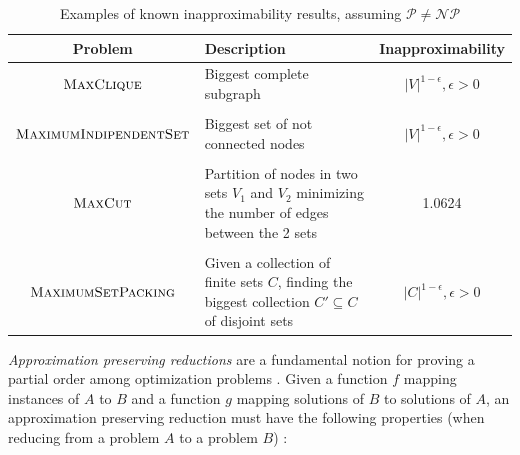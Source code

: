 \begin{table}
	\centering
	\caption[Examples of inapproximability]{Examples of known inapproximability results, assuming $\mathcal{P}
			\neq \mathcal{NP} $ \cite{10.1007/3-540-63248-4_10} }
	\label{tab:inapproximability-examples}
	\begin{tabular}{c|p{5cm}|c}
		Problem                                                          & Description               & Inapproximability \\
		\hline
		$ \textsc{MaxClique} $                                           & Biggest complete subgraph & $|V|^{1-
		\epsilon}, \epsilon > 0 $                                                                                        \\
		                                                                 &                           &                   \\
		$ \textsc{MaximumIndipendentSet} $                               &
		Biggest set of not connected nodes                               & $|V|^{1-
		\epsilon}, \epsilon > 0 $                                                                                        \\
		                                                                 &                           &                   \\
		$ \textsc{MaxCut} $                                              &
		Partition of nodes in two sets $V_1$ and $V_2$ minimizing the number of edges
		between the 2 sets                                               & 1.0624                                        \\
		                                                                 &                           &                   \\
		$ \textsc{MaximumSetPacking} $                                   & Given a collection of
		finite sets $C$,
		finding the biggest collection $C' \subseteq C$ of disjoint sets & $|C|^{1-
		\epsilon}, \epsilon > 0 $                                                                                        \\
	\end{tabular}
\end{table}

\emph{Approximation preserving reductions} are a fundamental notion for proving
a partial order among optimization problems \cite{Ausiello2005}. Given a
function $f$ mapping instances of $A$ to $B$ and a function $g$ mapping
solutions of $B$ to solutions of $A$, an
approximation preserving reduction must have
the following properties (when reducing from a problem $A$ to a problem $B$)
\cite{DemaineFall2014}:

